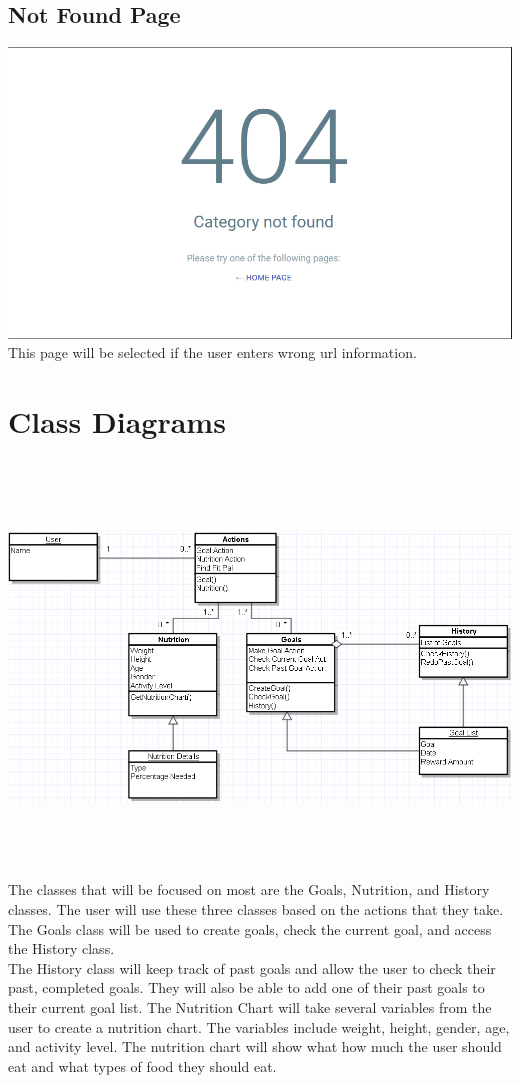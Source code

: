 \documentclass[a4paper]{article}
\begin{document}
\subsection{Not Found Page}
\includegraphics[width=\textwidth]{404Page.PNG}
This page will be selected if the user enters wrong url information.

\pagebreak
\section{Class Diagrams}
\includegraphics[width=\textwidth,height=11cm]{ClassDiagram.PNG}
The classes that will be focused on most are the Goals, Nutrition, and History classes.  The user will use these three classes based on the actions that they take.  The Goals class will be used to create goals, check the current goal, and access the History class.\\
The History class will keep track of past goals and allow the user to check their past, completed goals.  They will also be able to add one of their past goals to their current goal list.  The Nutrition Chart will take several variables from the user to create a nutrition chart.  The variables include weight, height, gender, age, and activity level.  The nutrition chart will show what how much the user should eat and what types of food they should eat.
\end{document}
